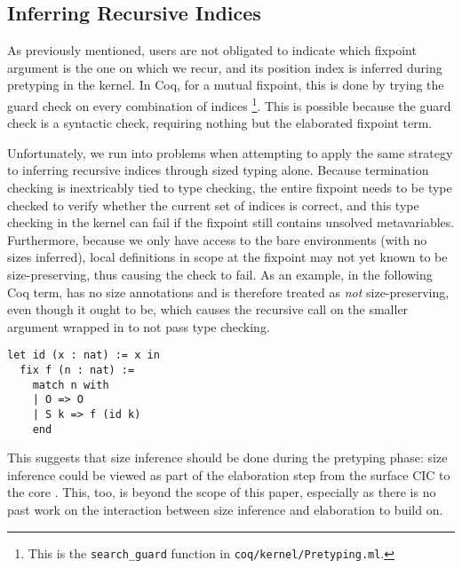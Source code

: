 \subsection{Inferring Recursive Indices}\label{sec:impl:recind}

As previously mentioned, users are not obligated to indicate which fixpoint argument is the one on which we recur,
and its position index is inferred during pretyping in the kernel.
In Coq, for a mutual fixpoint, this is done by trying the guard check on every combination of indices%
\footnote{This is the \texttt{search\_guard} function in \texttt{coq/kernel/Pretyping.ml}.}.
This is possible because the guard check is a syntactic check, requiring nothing but the elaborated fixpoint term.

Unfortunately, we run into problems when attempting to apply the same strategy to inferring recursive indices through sized typing alone.
Because termination checking is inextricably tied to type checking,
the entire fixpoint needs to be type checked to verify whether the current set of indices is correct,
and this type checking in the kernel can fail if the fixpoint still contains unsolved metavariables.
Furthermore, because we only have access to the bare environments (\ie with no sizes inferred),
local definitions in scope at the fixpoint may not yet known to be size-preserving,
thus causing the check to fail.
As an example, in the following Coq term,  has no size annotations and is therefore treated as \emph{not} size-preserving,
even though it ought to be, which causes the recursive call on the smaller argument wrapped in  to not pass type checking.
%
\begin{verbatim}
let id (x : nat) := x in
  fix f (n : nat) :=
    match n with
    | O => O
    | S k => f (id k)
    end
\end{verbatim}
%
This suggests that size inference should be done during the pretyping phase:
size inference could be viewed as part of the elaboration step from the surface CIC to the core \lang.
This, too, is beyond the scope of this paper, especially as there is no past work on the interaction between size inference and elaboration to build on.
